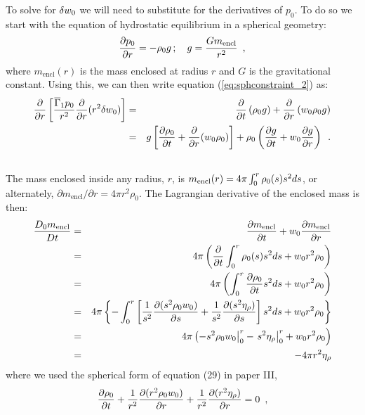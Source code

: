 To solve for $\delta w_0$ we will need to substitute for the derivatives of $p_0.$
To do so we start with the equation of hydrostatic equilibrium in a spherical geometry:
\[
\frac{\partial p_0}{\partial r} = -\rho_0 g \, ; \quad
g = \frac{G m_\mathrm{encl}}{r^2}\enskip,
\]
where $m_\mathrm{encl}(r)$ is the mass enclosed at radius $r$ and $G$ is the
gravitational constant.  
Using this, we can then write equation (\ref{eq:sphconstraint_2}) as:
\begin{eqnarray}
\frac{\partial}{\partial r} \left[ \frac{\overline{\Gamma}_1 p_0}{r^2} \frac{\partial}{\partial r} (r^2 \delta w_0) \right] &=&
 \frac{\partial}{\partial t} \left (\rho_0 g \right )
+\frac{\partial}{\partial r} \left (w_0 \rho_0 g \right) \nonumber \\
&=&
  g \left[ \frac{\partial \rho_0}{\partial t} + \frac{\partial}{\partial r} (w_0 \rho_0) \right]
+ \rho_0 \left( \frac{\partial g}{\partial t} + w_0 \frac{\partial g}{\partial r} \right) \enskip.\nonumber\\
&&
\label{eq:sphconstraint_3}
\end{eqnarray}
The mass enclosed inside any radius, $r$, is $m_\mathrm{encl}(r) = 4 \pi
\int_0^r \rho_0(s) s^2 ds$, or alternately, $\partial m_\mathrm{encl}/\partial r = 4\pi r^2 \rho_0$.  
The Lagrangian derivative of the enclosed mass is then:
\begin{eqnarray}
\frac{D_0 m_\mathrm{encl}}{D t} &=& \frac{\partial m_\mathrm{encl}}{\partial t} + w_0 \frac{\partial m_\mathrm{encl}}{\partial r} \nonumber \\
 &=& 4\pi \left( \frac{\partial}{\partial t} \int_0^r \rho_0(s) s^2 ds + w_0 r^2 \rho_0 \right) \nonumber \\
&=& 4\pi \left( \int_0^r \frac{\partial \rho_0}{\partial t} s^2 ds + w_0 r^2 \rho_0 \right) \nonumber \\
&=& 4\pi \left\{ -\int_0^r \left [ \frac{1}{s^2}\frac{\partial(s^2 \rho_0 w_0)}{\partial s} + \frac{1}{s^2}\frac{\partial (s^2 \eta_{\rho})}{\partial s} \right ]s^2 ds + w_0 r^2 \rho_0 \right\} \nonumber \\
&=&  \left . 4\pi \left(-s^2 \rho_0 w_0 \right |_0^r - \left . s^2 \eta_{\rho} \right |_0^r + w_0 r^2 \rho_0 \right) \nonumber \\
&=& -4\pi r^2 \eta_{\rho} \label{eq:dmdt}
\end{eqnarray}
where we used the spherical form of equation (29) in paper III, 
\begin{equation}
\label{eq:sph_continuity}
\frac{\partial \rho_0}{\partial t} + \frac{1}{r^2} \frac{\partial (r^2 \rho_0 w_0)}{\partial r} 
+ \frac{1}{r^2} \frac{\partial (r^2 \eta_{\rho} )}{\partial r}  = 0 \enskip ,
\end{equation}
